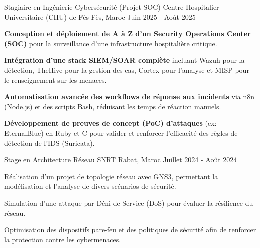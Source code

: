 


\begin{cventries}

  \cventry
  {Stagiaire en Ingénierie Cybersécurité (Projet SOC)} %
  {Centre Hospitalier Universitaire (CHU) de Fès} %
  {Fès, Maroc} %
  {Juin 2025 - Août 2025} %
  {
    \begin{cvitems}
      \item {
                  \textbf{Conception et déploiement de A à Z d'un Security Operations Center (SOC)} pour la surveillance d'une infrastructure hospitalière critique.}
      \item {
                  \textbf{Intégration d'une stack SIEM/SOAR complète} incluant Wazuh pour la détection, TheHive pour la gestion des cas, Cortex pour l'analyse et MISP pour le renseignement sur les menaces.}
      \item {
                  \textbf{Automatisation avancée des workflows de réponse aux incidents} via n8n (Node.js) et des scripts Bash, réduisant les temps de réaction manuels.}
      \item {
                  \textbf{Développement de preuves de concept (PoC) d'attaques} (ex: EternalBlue) en Ruby et C pour valider et renforcer l'efficacité des règles de détection de l'IDS (Suricata).}
    \end{cvitems}
  }
  \cventry
  {Stage en Architecture Réseau} %
  {SNRT} %
  {Rabat, Maroc} %
  {Juillet 2024 - Août 2024} %
  {
    \begin{cvitems} %
      \item {Réalisation d'un projet de topologie réseau avec GNS3, permettant la modélisation et l'analyse de divers scénarios de sécurité.}
      \item {Simulation d’une attaque par Déni de Service (DoS) pour évaluer la résilience du réseau.}
      \item {Optimisation des dispositifs pare-feu et des politiques de sécurité afin de renforcer la protection contre les cybermenaces.}
    \end{cvitems}
  }
\end{cventries}
